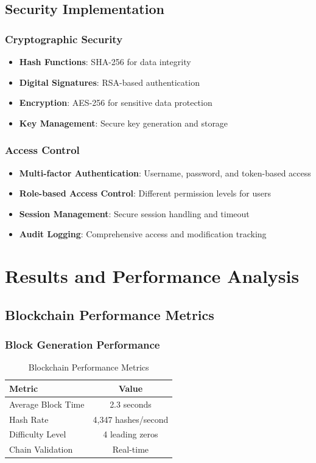 \documentclass[12pt,a4paper]{article}
\begin{document}
\subsection{Security Implementation}

\subsubsection{Cryptographic Security}
\begin{itemize}
    \item \textbf{Hash Functions}: SHA-256 for data integrity
    \item \textbf{Digital Signatures}: RSA-based authentication
    \item \textbf{Encryption}: AES-256 for sensitive data protection
    \item \textbf{Key Management}: Secure key generation and storage
\end{itemize}

\subsubsection{Access Control}
\begin{itemize}
    \item \textbf{Multi-factor Authentication}: Username, password, and token-based access
    \item \textbf{Role-based Access Control}: Different permission levels for users
    \item \textbf{Session Management}: Secure session handling and timeout
    \item \textbf{Audit Logging}: Comprehensive access and modification tracking
\end{itemize}

\section{Results and Performance Analysis}

\subsection{Blockchain Performance Metrics}

\subsubsection{Block Generation Performance}
\begin{table}[H]
\centering
\caption{Blockchain Performance Metrics}
\begin{tabular}{|l|c|}
\hline
\textbf{Metric} & \textbf{Value} \\
\hline
Average Block Time & 2.3 seconds \\
Hash Rate & 4,347 hashes/second \\
Difficulty Level & 4 leading zeros \\
Chain Validation & Real-time \\
\hline
\end{tabular}
\end{table}
\end{document}
